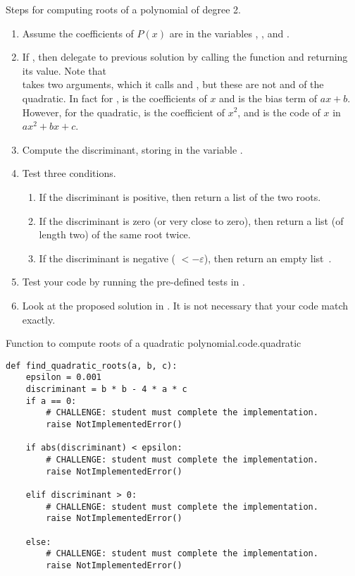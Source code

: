 Steps for computing roots of a polynomial of degree 2.
\begin{enumerate}
\item Assume the coefficients of $P(x)$ are in the variables , , and .
\item If , then delegate to previous solution by calling the function  and returning its value.  Note that \\
   takes two arguments, which it calls  and , but these are not  and  of the quadratic.   In fact for ,  is the coefficients of $x$ and  is the bias term of $a x + b$.  However, for the quadratic,  is the coefficient of $x^2$, and  is the code of $x$ in $a x^2 + b x + c$.
\item Compute the discriminant, storing in the variable .
\item Test three conditions.
  \begin{enumerate}
  \item If the discriminant is positive, then return a list of the two roots.
  \item If the discriminant is zero (or very close to zero), then return a list (of length two) of the same root twice.
  \item If the discriminant is negative ( $< -\varepsilon$), then return an empty list~\code{[]}.
  \end{enumerate}

\item Test your code by running the pre-defined tests in .

\item Look at the proposed solution in .  It is not necessary that your code match exactly.


\end{enumerate}


\begin{listing}{Function to compute roots of a quadratic polynomial.}{code.quadratic}
\begin{minipage}[c]{0.95\textwidth}\begin{lstlisting}
def find_quadratic_roots(a, b, c):
    epsilon = 0.001
    discriminant = b * b - 4 * a * c
    if a == 0:
        # CHALLENGE: student must complete the implementation.
        raise NotImplementedError()

    if abs(discriminant) < epsilon:
        # CHALLENGE: student must complete the implementation.
        raise NotImplementedError()

    elif discriminant > 0:
        # CHALLENGE: student must complete the implementation.
        raise NotImplementedError()

    else:
        # CHALLENGE: student must complete the implementation.
        raise NotImplementedError()

\end{lstlisting}\end{minipage}\end{listing}

